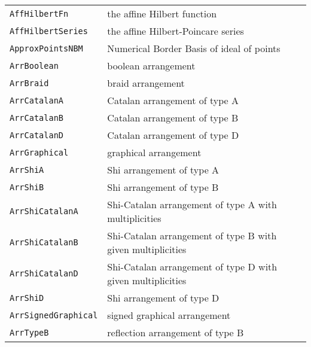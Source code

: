 \documentclass[a4paper]{mybook}
\begin{document}
\begin{center}
\begin{longtable}{ll}
   
{\verb~AffHilbertFn~} &
      the affine Hilbert function\\
   
{\verb~AffHilbertSeries~} &
      the affine Hilbert-Poincare series\\
   
{\verb~ApproxPointsNBM~} &
      Numerical Border Basis of ideal of points\\
   
{\verb~ArrBoolean~} &
      boolean arrangement\\
   
{\verb~ArrBraid~} &
      braid arrangement\\
   
{\verb~ArrCatalanA~} &
      Catalan arrangement of type A\\
   
{\verb~ArrCatalanB~} &
      Catalan arrangement of type B\\
   
{\verb~ArrCatalanD~} &
      Catalan arrangement of type D\\
   
{\verb~ArrGraphical~} &
      graphical arrangement\\
   
{\verb~ArrShiA~} &
      Shi arrangement of type A\\
   
{\verb~ArrShiB~} &
      Shi arrangement of type B\\
   
{\verb~ArrShiCatalanA~} &
      Shi-Catalan arrangement of type A with multiplicities\\
   
{\verb~ArrShiCatalanB~} &
      Shi-Catalan arrangement of type B with given multiplicities\\
   
{\verb~ArrShiCatalanD~} &
      Shi-Catalan arrangement of type D with given multiplicities\\
   
{\verb~ArrShiD~} &
      Shi arrangement of type D\\
   
{\verb~ArrSignedGraphical~} &
      signed graphical arrangement\\
   
{\verb~ArrTypeB~} &
      reflection arrangement of type B\\
   

\end{longtable}
\end{center}
\end{document}
